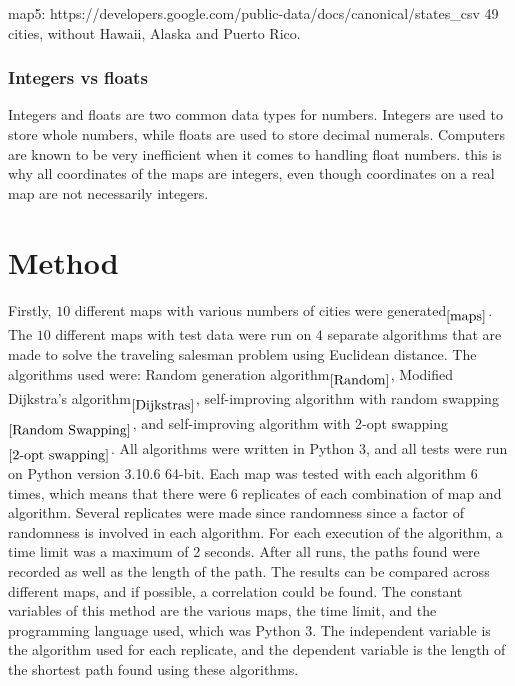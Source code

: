 \documentclass{article}
\begin{document}
map5: https://developers.google.com/public-data/docs/canonical/states_csv 49 cities, without Hawaii, Alaska and Puerto Rico.


\subsubsection{Integers vs floats}\label{Int vs Float}
Integers and floats are two common data types for numbers. Integers are used to store whole numbers, while floats are used to store decimal numerals. Computers are known to be very inefficient when it comes to handling float numbers.
this is why all coordinates of the maps are integers, even though coordinates on a real map are not necessarily integers. 




\section{Method}\label{Method}
Firstly, $10$ different maps with various numbers of cities were generated$_{\ref{maps}}$. The $10$ different maps with test data were run on $4$ separate algorithms that are made to solve the traveling salesman problem using Euclidean distance. The algorithms used were: Random generation algorithm$_{\ref{Random}}$, Modified Dijkstra's algorithm$_{\ref{Dijkstras}}$, self-improving algorithm with random swapping$_{\ref{Random Swapping}}$, and self-improving algorithm with 2-opt swapping$_{\ref{2-opt swapping}}$. All algorithms were written in Python 3, and all tests were run on Python version 3.10.6 64-bit. Each map was tested with each algorithm $6$ times, which means that there were $6$ replicates of each combination of map and algorithm. Several replicates were made since randomness since a factor of randomness is involved in each algorithm. For each execution of the algorithm, a time limit was a maximum of 2 seconds. After all runs, the paths found were recorded as well as the length of the path. The results can be compared across different maps, and if possible, a correlation could be found. 
\noindent
The constant variables of this method are the various maps, the time limit, and the programming language used, which was Python 3. The independent variable is the algorithm used for each replicate, and the dependent variable is the length of the shortest path found using these algorithms.
\end{document}
